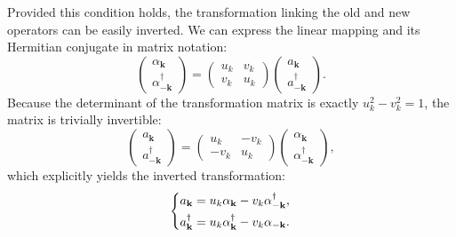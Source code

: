 Provided this condition holds, the transformation linking the old and new operators can be easily inverted. We can express the linear mapping and its Hermitian conjugate in matrix notation:
\[
    \begin{pmatrix} \alpha_{\mathbf{k}} \\ \alpha_{-\mathbf{k}}^\dagger \end{pmatrix} = \begin{pmatrix} u_k & v_k \\ v_k & u_k \end{pmatrix} \begin{pmatrix} a_{\mathbf{k}} \\ a_{-\mathbf{k}}^\dagger \end{pmatrix}.
\]
Because the determinant of the transformation matrix is exactly \( u_k^2 - v_k^2 = 1 \), the matrix is trivially invertible:
\[
    \begin{pmatrix} a_{\mathbf{k}} \\ a_{-\mathbf{k}}^\dagger \end{pmatrix} = \begin{pmatrix} u_k & -v_k \\ -v_k & u_k \end{pmatrix} \begin{pmatrix} \alpha_{\mathbf{k}} \\ \alpha_{-\mathbf{k}}^\dagger \end{pmatrix},
\]
which explicitly yields the inverted transformation:
\[
    \begin{dcases}
        a_{\mathbf{k}} = u_k \alpha_{\mathbf{k}} - v_k \alpha_{-\mathbf{k}}^\dagger, \\
        a_{\mathbf{k}}^\dagger = u_k \alpha_{\mathbf{k}}^\dagger - v_k \alpha_{-\mathbf{k}}.
    \end{dcases}
\]

